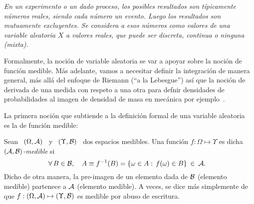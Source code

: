\label{Sec:MP:variablealeatoria}

{\it  En  un  experimento  o  un  dado  proceso,  los  posibles  resultados  son
  t\'ipicamente  n\'umeros reales, siendo  cada n\'umero  un evento.   Luego los
  resultados  son mutuamente  excluyentes. Se  considera a  esos  n\'umeros como
  valores de una  \emph{variable aleatoria} $X$ a valores  reales, que puede ser
  discreta, continua o ninguna (mixta).}

Formalmente, la noci\'on de variable aleatoria se var a apoyar sobre la noci\'on
de funci\'on medible. M\'as adelante, vamos a necesitar definir la integraci\'on
de manera general, m\'as all\'a del enfoque de Riemann (``a la Lebesgue'') as\'i
que la  noci\'on de derivada de  una medida con  respeto a una otra  para defnir
densidades de  probabilidades al  imagen de densidad  de masa en  mec\'anica por
ejemplo~\cite{Leb04, Leb18, KolFom61, AthLah06, Bog07:v1, Coh13}.



\label{Ssec:MP:VAPreliminaria}

La  primera noci\'on  que subtiende  a la  definici\'on formal  de  una variable
aleatoria es la de funci\'on medible:

\begin{definicion}
  Sean  \ $(\Omega,\mathcal{A})$  \ y  \ $(\Upsilon,\mathcal{B})$  \ dos  espacios  medibles.  Una
  funci\'on $f: \Omega \mapsto \Upsilon$ es dicha {\it $(\mathcal{A},\mathcal{B})$-medible} si
  \[
  \forall \,  B \in  \mathcal{B}, \quad  A \equiv f^{-1}(B)  = \left\{  \omega \in  A: \,
    f(\omega) \in B \right\} \: \in \: \mathcal{A}.
  \]
  Dicho de  otra manera,  la pre-imagen  de un elemento  dada de  $\mathcal{B}$ (elemento
  medible)  partenece  a  $\mathcal{A}$  (elemento  medible).  A  veces,  se  dice  m\'as
  simplemente de que $f: (\Omega,\mathcal{A}) \mapsto (\Upsilon,\mathcal{B})$ es medible por abuso
  de escritura.
\end{definicion}

